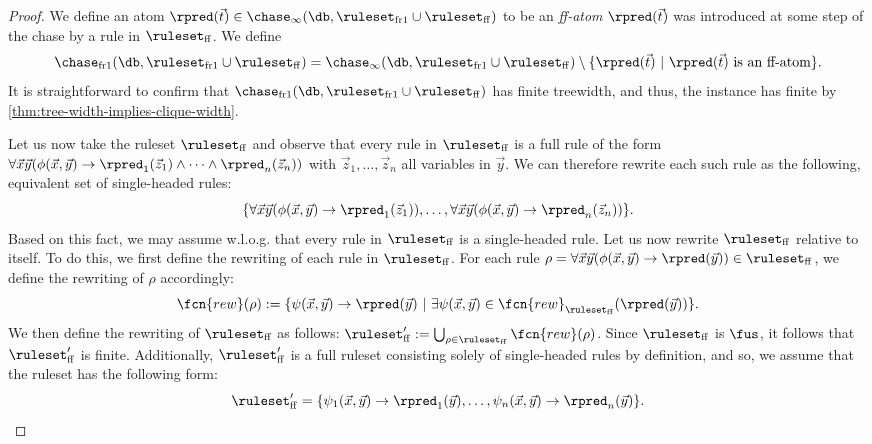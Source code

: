 \begin{proof} We define an atom $\rpred(\vec{t}) \in \chase_{\infty}(\db,\ruleset_{\smash{\mathrm{fr1}}} \cup \ruleset_{\smash{\mathrm{ff}}})$ to be an \emph{ff-atom} \iffi $\rpred(\vec{t})$ was introduced at some step of the chase by a rule in $\ruleset_{\smash{\mathrm{ff}}}$. We define 
$$
\chase_{\smash{\mathrm{fr1}}}(\db,\ruleset_{\smash{\mathrm{fr1}}} \cup \ruleset_{\smash{\mathrm{ff}}}) = \chase_{\infty}(\db,\ruleset_{\smash{\mathrm{fr1}}} \cup \ruleset_{\smash{\mathrm{ff}}}) \setminus \{\rpred(\vec{t}) \ | \ \rpred(\vec{t}) \text{ is an ff-atom} \}.
$$%
 It is straightforward to confirm that $\chase_{\smash{\mathrm{fr1}}}(\db,\ruleset_{\smash{\mathrm{fr1}}} \cup \ruleset_{\smash{\mathrm{ff}}})$ has finite treewidth, and thus, the instance has finite \hypercliquewidth{} by \cref{thm:tree-width-implies-clique-width}. 
 
 Let us now take the ruleset $\ruleset_{\smash{\mathrm{ff}}}$ and observe that every rule in $\ruleset_{\smash{\mathrm{ff}}}$ is a full rule of the form $\forall \vec{x} \vec{y}(\phi(\vec{x},\vec{y}) \rightarrow \rpred_{1}(\vec{z}_{1}) \land \cdots \land \rpred_{n}(\vec{z}_{n}))$ with $\vec{z}_{1}, \ldots, \vec{z}_{n}$ all variables in $\vec{y}$. We can therefore rewrite each such rule as the following, equivalent set of single-headed rules:
$$
\{\forall \vec{x} \vec{y}(\phi(\vec{x},\vec{y}) \rightarrow \rpred_{1}(\vec{z}_{1})), \ldots, \forall \vec{x} \vec{y}(\phi(\vec{x},\vec{y}) \rightarrow \rpred_{n}(\vec{z}_{n}))\}.
$$%
Based on this fact, we may assume w.l.o.g. that every rule in $\ruleset_{\smash{\mathrm{ff}}}$ is a single-headed rule.
%
 Let us now rewrite $\ruleset_{\smash{\mathrm{ff}}}$ relative to itself. To do this, we first define the rewriting of each rule in $\ruleset_{\smash{\mathrm{ff}}}$. For each rule $\rho = \forall \vec{x} \vec{y}(\phi(\vec{x},\vec{y}) \rightarrow \rpred(\vec{y})) \in \ruleset_{\smash{\mathrm{ff}}}$, we define the rewriting of $\rho$ accordingly:
$$
\fcn{rew}(\rho) := \{\psi(\vec{x}, \vec{y}) \rightarrow \rpred(\vec{y}) \ | \ \exists \psi(\vec{x},\vec{y}) \in \fcn{rew}_{\ruleset_{\smash{\mathrm{ff}}}}(\rpred(\vec{y})) \}.
$$%
We then define the rewriting of $\ruleset_{\smash{\mathrm{ff}}}$ as follows: $\ruleset_{\smash{\mathrm{ff}}}' := \bigcup_{\rho \in \ruleset_{\smash{\mathrm{ff}}}} \fcn{rew}(\rho)$. Since $\ruleset_{\smash{\mathrm{ff}}}$ is $\fus$, it follows that $\ruleset_{\smash{\mathrm{ff}}}'$ is finite. Additionally, $\ruleset_{\smash{\mathrm{ff}}}'$ is a full ruleset consisting solely of single-headed rules by definition, and so, we assume that the ruleset has the following form:
$$
\ruleset_{\smash{\mathrm{ff}}}' = \{\psi_{1}(\vec{x}, \vec{y}) \rightarrow \rpred_{1}(\vec{y}), \ldots, \psi_{n}(\vec{x}, \vec{y}) \rightarrow \rpred_{n}(\vec{y})\}.
$$


\end{proof}
